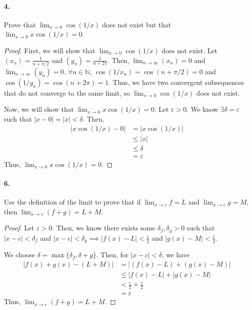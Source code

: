 \documentclass[12pt]{article}
\newcommand\N{\mathbb{N}}
\theoremstyle{remark}
\begin{document}
\paragraph{4.} Prove that $\lim_{x \to 0} \cos(1/x)$ does not exist but that $\lim_{x \to 0} x \cos(1/x) = 0$.
\begin{proof}
    First, we will show that $\lim_{x \to 0} \cos(1/x)$ does not exist. Let $(x_n) = \frac{1}{n + \pi/2}$ and $(y_n) = \frac{1}{n + 2\pi}$. Then, $\lim_{n \to \infty} (x_n) = 0$ and $\lim_{n \to \infty} (y_n) = 0$. $\forall n \in \N$, $\cos(1/x_n) = \cos(n + \pi/2) = 0$ and $\cos(1/y_n) = \cos(n + 2\pi) = 1$. Thus, we have two convergent subsequences that do not converge to the same limit, so $\lim_{x \to 0} \cos(1/x)$ does not exist.

    Now, we will show that $\lim_{x \to 0} x \cos(1/x) = 0$. Let $\varepsilon > 0$. We know $\exists \delta = \varepsilon$ such that $|x - 0| = |x| < \delta$. Then,
    \begin{align*}
        |x \cos(1/x) - 0| &= |x \cos(1/x)| \\
        &\leq |x| \\
        &\leq \delta \\
        &= \varepsilon
    \end{align*}
    Thus, $\lim_{x \to 0} x \cos(1/x) = 0$.
\end{proof}

\paragraph{6.} Use the definition of the limit to prove that if $\lim_{x \to c} f = L$ and $\lim_{x \to c} g = M$, then $\lim_{x \to c} (f + g) = L + M$.
\begin{proof}
    Let $\varepsilon > 0$. Then, we know there exists some $\delta_f, \delta_g > 0$ such that $|x - c| < \delta_f$ and $|x - c| < \delta_g \implies |f(x) - L| < \frac{\varepsilon}{2}$ and $|g(x) - M| < \frac{\varepsilon}{2}$.
    
    We choose $\delta = \max\{\delta_f, \delta+g\}$. Then, for $|x - c| < \delta$, we have
    \begin{align*}
        |f(x) + g(x) - (L + M)| &= |(f(x) - L) + (g(x) - M)| \\
        &\leq |f(x) - L| + |g(x) - M| \\
        &< \frac{\varepsilon}{2} + \frac{\varepsilon}{2} \\
        &= \varepsilon
    \end{align*}
    Thus, $\lim_{x \to c} (f + g) = L + M$.
\end{proof}
\end{document}
